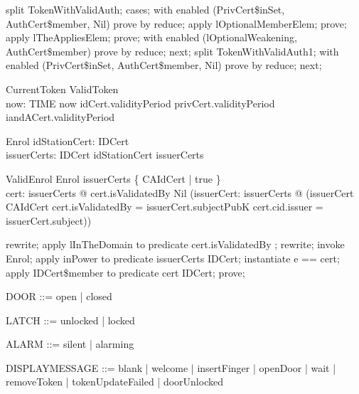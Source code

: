 \begin{zproof}[lTokenWithValidAuthEquiv]
split TokenWithValidAuth;
cases;
with enabled (PrivCert\$inSet, AuthCert\$member, Nil) prove by reduce;
apply lOptionalMemberElem;
prove;
apply lTheAppliesElem;
prove;
with enabled (lOptionalWeakening, AuthCert\$member) prove by reduce;
next;
split TokenWithValidAuth1;
with enabled (PrivCert\$inSet, AuthCert\$member, Nil) prove by reduce;
next;
\end{zproof}

\begin{schema}{CurrentToken}
  ValidToken\\
  now: TIME
\where
  now \in  idCert.validityPeriod \cap  privCert.validityPeriod \cap  iandACert.validityPeriod
\end{schema}

\begin{schema}{Enrol}
  idStationCert: IDCert\\
  issuerCerts: \power  IDCert
\where
  idStationCert \in  issuerCerts
\end{schema}

\begin{schema}{ValidEnrol}
  Enrol
\where
  issuerCerts \cap  \{  CAIdCert | true \} \neq  \emptyset\\
  \forall  cert: issuerCerts @ cert.isValidatedBy \neq  Nil \land  (\exists  issuerCert: issuerCerts @ (issuerCert \in  CAIdCert \land  \The cert.isValidatedBy = issuerCert.subjectPubK \land  cert.cid.issuer = issuerCert.subject))
\end{schema}

\begin{zproof}
rewrite;
apply lInTheDomain to predicate cert.isValidatedBy \in  \dom  \The;
rewrite;
invoke Enrol;
apply inPower to predicate issuerCerts \in  \power  IDCert;
instantiate e == cert;
apply IDCert\$member to predicate cert \in  IDCert;
prove;
\end{zproof}

\begin{zed}
DOOR ::= open | closed
\end{zed}

\begin{zed}
LATCH ::= unlocked | locked
\end{zed}

\begin{zed}
ALARM ::= silent | alarming
\end{zed}

\begin{zed}
DISPLAYMESSAGE ::= blank | welcome | insertFinger | openDoor | wait | removeToken | tokenUpdateFailed | doorUnlocked
\end{zed}

